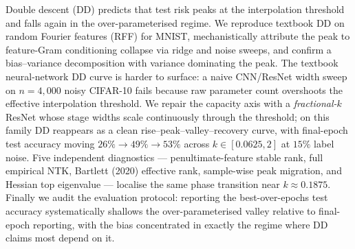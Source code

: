 Double descent (DD) predicts that test risk peaks at the interpolation threshold and falls again in the over-parameterised regime. We reproduce textbook DD on random Fourier features (RFF) for MNIST, mechanistically attribute the peak to feature-Gram conditioning collapse via ridge and noise sweeps, and confirm a bias--variance decomposition with variance dominating the peak. The textbook neural-network DD curve is harder to surface: a naive CNN/ResNet width sweep on $n=4{,}000$ noisy CIFAR-10 fails because raw parameter count overshoots the effective interpolation threshold. We repair the capacity axis with a \emph{fractional-$k$} ResNet whose stage widths scale continuously through the threshold; on this family DD reappears as a clean rise--peak--valley--recovery curve, with final-epoch test accuracy moving $26\%\!\to\!49\%\!\to\!53\%$ across $k\in[0.0625, 2]$ at $15\%$ label noise. Five independent diagnostics --- penultimate-feature stable rank, full empirical NTK, Bartlett (2020) effective rank, sample-wise peak migration, and Hessian top eigenvalue --- localise the same phase transition near $k\approx0.1875$. Finally we audit the evaluation protocol: reporting the best-over-epochs test accuracy systematically shallows the over-parameterised valley relative to final-epoch reporting, with the bias concentrated in exactly the regime where DD claims most depend on it.
